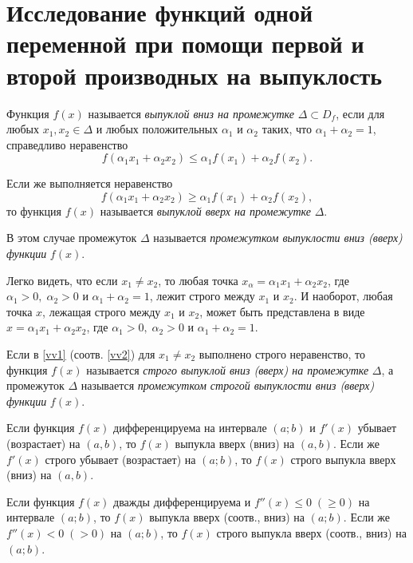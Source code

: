 \section{Исследование функций одной переменной при помощи первой и второй производных на выпуклость}

\begin{defn}
Функция $f(x)$ называется \textit{выпуклой вниз на промежутке} $\Delta\subset D_f$, если для любых $x_1,x_2\in\Delta$ и любых положительных $\alpha_1$ и $\alpha_2$ таких, что $\alpha_1+\alpha_2=1$, справедливо неравенство
\begin{equation} \label{vv1}
f(\alpha_1x_1+\alpha_2x_2) \le \alpha_1f(x_1)+\alpha_2f(x_2).
\end{equation}

Если же выполняется неравенство
\begin{equation} \label{vv2}
f(\alpha_1x_1+\alpha_2x_2) \ge \alpha_1f(x_1)+\alpha_2f(x_2),
\end{equation}
то функция $f(x)$ называется \textit{выпуклой вверх на промежутке} $\Delta$.

В этом случае промежуток $\Delta$ называется \textit{промежутком выпуклости вниз (вверх) функции} $f(x)$.
\end{defn}

Легко видеть, что если $x_1\neq x_2$, то любая точка $x_\alpha=\alpha_1x_1+\alpha_2x_2$, где $\alpha_1>0,\;\alpha_2>0$ и $\alpha_1+\alpha_2=1$, лежит строго между $x_1$ и $x_2$. И наоборот, любая точка $x$, лежащая строго между $x_1$ и $x_2$, может быть представлена в виде $x=\alpha_1x_1+\alpha_2x_2$, где $\alpha_1>0,\;\alpha_2>0$ и $\alpha_1+\alpha_2=1$.

Если в \eqref{vv1} (соотв. \eqref{vv2}) для $x_1\neq x_2$ выполнено строго неравенство, то функция $f(x)$ называется \textit{строго выпуклой вниз (вверх) на промежутке} $\Delta$, а промежуток $\Delta$ называется \textit{промежутком строгой выпуклости вниз \textup{(вверх}) функции} $f(x)$.

\begin{thm}
Если функция $f(x)$ дифференцируема на интервале $(a;b)$ и $f'(x)$ убывает (возрастает) на $(a,b)$, то $f(x)$ выпукла вверх (вниз) на $(a,b)$. Если же $f'(x)$ строго убывает (возрастает) на $(a;b)$, то $f(x)$ строго выпукла вверх (вниз) на $(a,b)$.
\end{thm}

\begin{cons}
Если функция $f(x)$ дважды дифференцируема и $f''(x)\le 0\;(\ge 0)$ на интервале $(a;b)$, то $f(x)$ выпукла вверх (соотв., вниз) на $(a;b)$. Если же $f''(x)<0\;(>0)$ на $(a;b)$, то $f(x)$ строго выпукла вверх (соотв., вниз) на $(a;b)$.
\end{cons}


